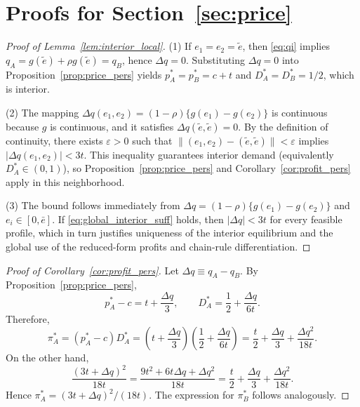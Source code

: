 \appendix

\section{Proofs for Section~\ref{sec:price}}
\label{app:price}

\begin{proof}[Proof of Lemma~\ref{lem:interior_local}]
\label{app:proof-interior}
(1) If $e_1=e_2=\tilde e$, then \eqref{eq:qi} implies $q_A=g(\tilde e)+\rho g(\tilde e)=q_B$, hence $\Delta q=0$. Substituting $\Delta q=0$ into Proposition~\ref{prop:price_pers} yields $p_A^*=p_B^*=c+t$ and $D_A^*=D_B^*=1/2$, which is interior.

(2) The mapping $\Delta q(e_1,e_2)=(1-\rho)\{g(e_1)-g(e_2)\}$ is continuous because $g$ is continuous, and it satisfies $\Delta q(\tilde e,\tilde e)=0$. By the definition of continuity, there exists $\varepsilon>0$ such that $\|(e_1,e_2)-(\tilde e,\tilde e)\|<\varepsilon$ implies $|\Delta q(e_1,e_2)|<3t$. This inequality guarantees interior demand (equivalently $D_A^*\in(0,1)$), so Proposition~\ref{prop:price_pers} and Corollary~\ref{cor:profit_pers} apply in this neighborhood.

(3) The bound follows immediately from $\Delta q=(1-\rho)\{g(e_1)-g(e_2)\}$ and $e_i\in[0,\bar e]$. If \eqref{eq:global_interior_suff} holds, then $|\Delta q|<3t$ for every feasible profile, which in turn justifies uniqueness of the interior equilibrium and the global use of the reduced-form profits and chain-rule differentiation.
\end{proof}

\begin{proof}[Proof of Corollary~\ref{cor:profit_pers}]
\label{app:proof-profit-red}
Let $\Delta q\equiv q_A-q_B$. By Proposition~\ref{prop:price_pers},
\[
p_A^*-c=t+\frac{\Delta q}{3},
\qquad
D_A^*=\frac{1}{2}+\frac{\Delta q}{6t}.
\]
Therefore,
\[
\pi_A^*=(p_A^*-c)D_A^*
=\left(t+\frac{\Delta q}{3}\right)\left(\frac{1}{2}+\frac{\Delta q}{6t}\right)
=\frac{t}{2}+\frac{\Delta q}{3}+\frac{\Delta q^2}{18t}.
\]
On the other hand,
\[
\frac{(3t+\Delta q)^2}{18t}
=\frac{9t^2+6t\Delta q+\Delta q^2}{18t}
=\frac{t}{2}+\frac{\Delta q}{3}+\frac{\Delta q^2}{18t}.
\]
Hence $\pi_A^*=(3t+\Delta q)^2/(18t)$. The expression for $\pi_B^*$ follows analogously.
\end{proof}


